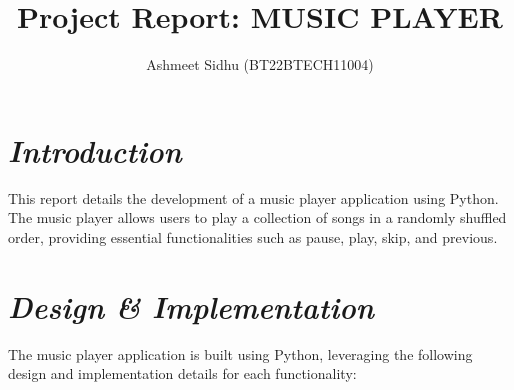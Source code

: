 \documentclass{article}
\title{\textbf{Project Report: MUSIC PLAYER}}
\author{Ashmeet Sidhu (BT22BTECH11004)}
\date{}
\begin{document}
\maketitle


\section{\emph{Introduction}}
This report details the development of a music player application using Python. The music player allows users to play a collection of songs in a randomly shuffled order, providing essential functionalities such as pause, play, skip, and previous.

\section{\emph{Design \& Implementation}}
The music player application is built using Python, leveraging the following design and implementation details for each functionality:
\end{document}
